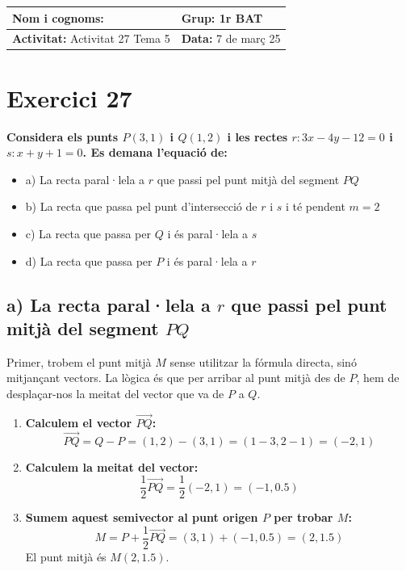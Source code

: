 \documentclass[12pt,a4paper]{article}
\begin{document}
\begingroup
\renewcommand{\arraystretch}{2.2}
\begin{tabularx}{\textwidth}{|X|p{4cm}|}
    \hline
    \textbf{Nom i cognoms:} & \textbf{Grup:} 1r BAT \\ \hline
    \textbf{Activitat:} Activitat 27 Tema 5 & \textbf{Data:} 7 de març 25 \\ \hline
\end{tabularx}
\endgroup

\section*{Exercici 27}
\textbf{Considera els punts $P(3, 1)$ i $Q(1, 2)$ i les rectes $r: 3x - 4y - 12 = 0$ i $s: x + y + 1 = 0$. Es demana l'equació de:}

\vspace{0.5cm}

\begin{itemize}
    \item{a) La recta paral·lela a $r$ que passi pel punt mitjà del segment $PQ$}
    \item{b) La recta que passa pel punt d'intersecció de $r$ i $s$ i té pendent $m=2$}
    \item{c) La recta que passa per $Q$ i és paral·lela a $s$}
    \item{d) La recta que passa per $P$ i és paral·lela a $r$}
\end{itemize}

\subsection*{a) La recta paral·lela a $r$ que passi pel punt mitjà del segment $PQ$}

Primer, trobem el punt mitjà $M$ sense utilitzar la fórmula directa, sinó mitjançant vectors. La lògica és que per arribar al punt mitjà des de $P$, hem de desplaçar-nos la meitat del vector que va de $P$ a $Q$.

\begin{enumerate}
    \item \textbf{Calculem el vector $\vec{PQ}$:}
    \[ \vec{PQ} = Q - P = (1, 2) - (3, 1) = (1-3, 2-1) = (-2, 1) \]
    
    \item \textbf{Calculem la meitat del vector:}
    \[ \frac{1}{2}\vec{PQ} = \frac{1}{2}(-2, 1) = (-1, 0.5) \]
    
    \item \textbf{Sumem aquest semivector al punt origen $P$ per trobar $M$:}
    \[ M = P + \frac{1}{2}\vec{PQ} = (3, 1) + (-1, 0.5) = (2, 1.5) \]
    El punt mitjà és $M(2, 1.5)$.
\end{enumerate}
\end{document}
